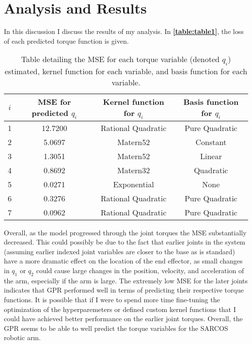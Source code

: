 \documentclass{article}
\begin{document}
    \section{Analysis and Results}
    
    In this discussion I discuss the results of my analysis. In \textbf{\autoref{table:table1}},
    the loss of each predicted torque function is given.
    
    \begin{table}[h] \centering
        \caption{\centering Table detailing the MSE for each torque variable (denoted $q_{i}$) estimated,
        kernel function for each variable, and basis function for each variable.}
        \vspace*{1mm}
        \begin{tabular}{cccc}
            \midrule
            \midrule
            $i$ & MSE for predicted $q_{i}$ & Kernel function for $q_{i}$ & Basis function for $q_{i}$ \\
            \midrule
            1   & 12.7200                   & Rational Quadratic          & Pure Quadratic             \\
            2   &  5.0697                   & Matern52                    & Constant                   \\
            3   &  1.3051                   & Matern52                    & Linear                     \\
            4   &  0.8692                   & Matern32                    & Quadratic                  \\
            5   &  0.0271                   & Exponential                 & None                       \\
            6   &  0.3276                   & Rational Quadratic          & Pure Quadratic             \\
            7   &  0.0962                   & Rational Quadratic          & Pure Quadratic             \\
            \midrule
            \midrule
        \end{tabular}
        \label{table:table1}
    \end{table}
    
    Overall, as the model progressed through the joint torques the MSE substantially decreased.
    This could possibly be due to the fact that earlier joints in the system (assuming earlier
    indexed joint variables are closer to the base as is standard) have a more dramatic effect
    on the location of the end effector, as small changes in $q_{1}$ or $q_{2}$ could cause large
    changes in the position, velocity, and acceleration of the arm, especially if the arm is
    large. The extremely low MSE for the later joints indicates that GPR performed well in terms
    of predicting their respective torque functions. It is possible that if I were to spend more
    time fine-tuning the optimization of the hyperparemeters or defined custom kernel functions
    that I could have achieved better performance on the earlier joint torques. Overall, the GPR
    seems to be able to well predict the torque variables for the SARCOS robotic arm.
    
\end{document}
